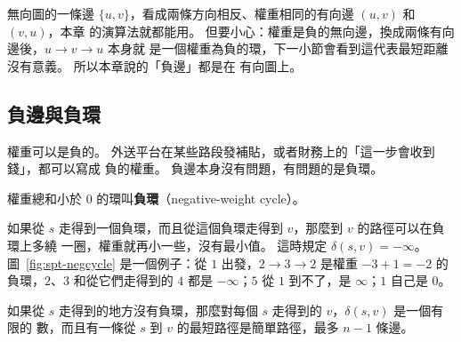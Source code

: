 無向圖的一條邊 $\{u, v\}$，看成兩條方向相反、權重相同的有向邊 $(u, v)$ 和 $(v, u)$，本章
的演算法就都能用。 但要小心：權重是負的無向邊，換成兩條有向邊後，$u \to v \to u$ 本身就
是一個權重為負的環，下一小節會看到這代表最短距離沒有意義。 所以本章說的「負邊」都是在
有向圖上。

\subsection{負邊與負環}

權重可以是負的。 外送平台在某些路段發補貼，或者財務上的「這一步會收到錢」，都可以寫成
負的權重。 負邊本身沒有問題，有問題的是負環。

\begin{definition}[負環]
\label{def:spt-negcycle}
權重總和小於 $0$ 的環叫\textbf{負環}（negative-weight cycle）。
\end{definition}

如果從 $s$ 走得到一個負環，而且從這個負環走得到 $v$，那麼到 $v$ 的路徑可以在負環上多繞
一圈，權重就再小一些，沒有最小值。 這時規定 $\delta(s, v) = -\infty$。
圖~\ref{fig:spt-negcycle} 是一個例子：從 $1$ 出發，$2 \to 3 \to 2$ 是權重 $-3 + 1 = -2$
的負環，$2$、$3$ 和從它們走得到的 $4$ 都是 $-\infty$；$5$ 從 $1$ 到不了，是 $\infty$；$1$
自己是 $0$。

\begin{center}
\par\nopagebreak
{}
\label{fig:spt-negcycle}
\end{center}

\begin{lemma}
\label{lem:spt-simple}
如果從 $s$ 走得到的地方沒有負環，那麼對每個 $s$ 走得到的 $v$，$\delta(s, v)$ 是一個有限的
數，而且有一條從 $s$ 到 $v$ 的最短路徑是簡單路徑，最多 $n - 1$ 條邊。
\end{lemma}

